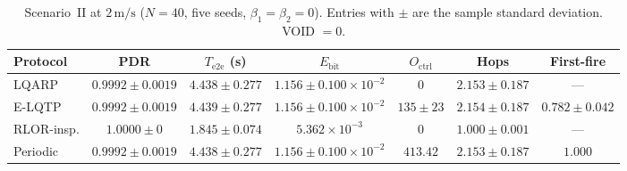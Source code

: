 
\begin{table}[!t]
\caption{Scenario~II at $2\,\mathrm{m/s}$ ($N=40$, five seeds,
$\beta_1=\beta_2=0$). Entries with $\pm$ are the sample standard
deviation. VOID $=0$.}
\label{tab:s2_protocols}
\centering
\small
\begin{tabular}{lcccccc}
\hline
Protocol & PDR & $T_{\mathrm{e2e}}$ (s) & $E_{\mathrm{bit}}$
  & $O_{\mathrm{ctrl}}$ & Hops & First-fire \\
\hline
LQARP & $0.9992\pm 0.0019$ & $4.438\pm 0.277$ & $1.156\pm 0.100\times 10^{-2}$
  & $0$ & $2.153\pm 0.187$ & --- \\
E-LQTP & $0.9992\pm 0.0019$ & $4.439\pm 0.277$ & $1.156\pm 0.100\times 10^{-2}$
  & $135\pm 23$ & $2.154\pm 0.187$ & $0.782\pm 0.042$ \\
RLOR-insp. & $1.0000\pm 0$ & $1.845\pm 0.074$ & $5.362\times 10^{-3}$
  & $0$ & $1.000\pm 0.001$ & --- \\
Periodic & $0.9992\pm 0.0019$ & $4.438\pm 0.277$ & $1.156\pm 0.100\times 10^{-2}$
  & $413.42$ & $2.153\pm 0.187$ & $1.000$ \\
\hline
\end{tabular}
\end{table}

